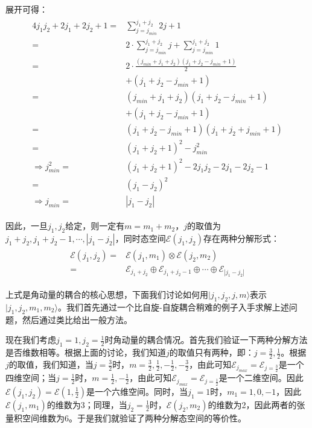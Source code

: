     展开可得：
    \begin{align}
    \begin{split}
        4j_1j_2+2j_1+2j_2+1=&\sum_{j=j_{min}}^{j_1+j_2}2j+1\\
         =& 2\cdot \sum_{j=j_{min}}^{j_1+j_2}j+\sum_{j=j_{min}}^{j_1+j_2}1\\
         =& 2\cdot \frac{(j_{min}+j_1+j_2)(j_1+j_2-j_{min}+1)}{2}\\
         &+(j_1+j_2-j_{min}+1)\\
         =& (j_{min}+j_1+j_2)(j_1+j_2-j_{min}+1)\\
         &+(j_1+j_2-j_{min}+1)\\
         =& (j_1+j_2-j_{min}+1)(j_1+j_2+j_{min}+1)\\
         =& (j_1+j_2+1)^2-j_{min}^2\\
         \Longrightarrow j_{min}^2=&(j_1+j_2+1)^2-2j_1j_2-2j_1-2j_2-1\\
         =& (j_1-j_2)^2\\
         \Longrightarrow j_{min}=& |j_1-j_2|
    \end{split}
    \end{align}
    
    因此，一旦$j_1,j_2$给定，则一定有$m=m_1+m_2$，$j$的取值为$j_1+j_2,j_1+j_2-1,\cdots,|j_1-j_2|$，同时态空间$\mathcal{E}(j_1,j_2)$存在两种分解形式：
    \begin{align}
    \begin{split}
         \mathcal{E}(j_1,j_2)=&\mathcal{E}(j_1,m_1)\otimes\mathcal{E}(j_2,m_2)\\
         =&\mathcal{E}_{j_1+j_2}\oplus\mathcal{E}_{j_1+j_2-1}\oplus\cdots \oplus \mathcal{E}_{|j_1-j_2|}
    \end{split}
    \end{align}

上式是角动量的耦合的核心思想，下面我们讨论如何用$|j_1,j_2,j,m\rangle$表示$|j_1,j_2,m_1,m_2\rangle$。我们首先通过一个比自旋-自旋耦合稍难的例子入手求解上述问题，然后通过类比给出一般方法。

现在我们考虑$j_1=1,j_2=\frac{1}{2}$时角动量的耦合情况。首先我们验证一下两种分解方法是否维数相等。根据上面的讨论，我们知道$j$的取值只有两种，即：$j=\frac{3}{2},\frac{1}{2}$。根据$j$的取值，我们知道，当$j=\frac{3}{2}$时，$m=\frac{3}{2},\frac{1}{2},-\frac{1}{2},-\frac{3}{2}$，由此可知$\mathcal{E}_{j_{max}}=\mathcal{E}_{j=\frac{3}{2}}$是一个四维空间；当$j=\frac{1}{2}$时，$m=\frac{1}{2},-\frac{1}{2}$，由此可知$\mathcal{E}_{j_{max}}=\mathcal{E}_{j=\frac{1}{2}}$是一个二维空间。因此$\mathcal{E}(j_1,j_2)=\mathcal{E}(1,\frac{1}{2})$是一个六维空间。同时，当$j_1=1$时，$m_1=1,0,-1$，因此$\mathcal{E}(j_1,m_1)$的维数为3；同理，当$j_2=\frac{1}{2}$时，$\mathcal{E}(j_2,m_2)$的维数为2，因此两者的张量积空间维数为6。于是我们就验证了两种分解态空间的等价性。

